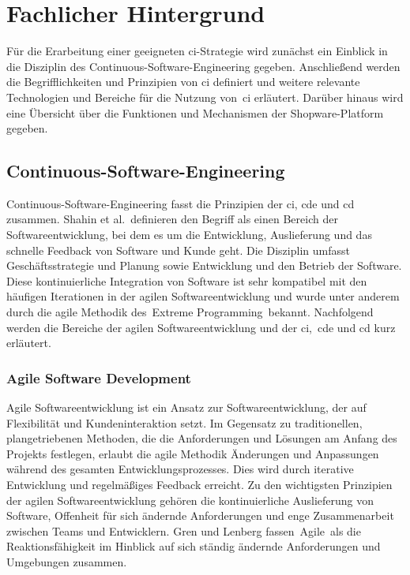 
\section{Fachlicher Hintergrund} \label{sec:02-background}

Für die Erarbeitung einer geeigneten \acrshort{ci}-Strategie wird zunächst ein Einblick in die Disziplin des
Continuous-Software-Engineering gegeben.
Anschließend werden die Begrifflichkeiten und Prinzipien von \acrlong{ci} definiert und weitere
relevante Technologien und Bereiche für die Nutzung von\ \acrshort{ci} erläutert.
Darüber hinaus wird eine Übersicht über die Funktionen und Mechanismen der Shopware-Platform gegeben.

\subsection{Continuous-Software-Engineering} \label{subsec:02-background-1}

Continuous-Software-Engineering fasst die Prinzipien der \acrfull{ci}, \acrfull{cde} und \acrfull{cd} zusammen.
Shahin et al.\ definieren den Begriff als einen Bereich der Softwareentwicklung, bei dem es um die Entwicklung,
Auslieferung und das schnelle Feedback von Software und Kunde geht.
Die Disziplin umfasst Geschäftsstrategie und Planung sowie Entwicklung und den Betrieb der Software.
Diese kontinuierliche Integration von Software ist sehr kompatibel mit den häufigen Iterationen in der agilen
Softwareentwicklung und wurde unter anderem durch die agile Methodik des\ \glqq Extreme Programming\grqq\ bekannt.
Nachfolgend werden die Bereiche der agilen Softwareentwicklung und der \acrshort{ci},\ \acrshort{cde} und \acrshort{cd}
kurz erläutert.

\subsubsection{Agile Software Development}

Agile Softwareentwicklung ist ein Ansatz zur Softwareentwicklung, der auf Flexibilität und Kundeninteraktion setzt.
Im Gegensatz zu traditionellen, plangetriebenen Methoden, die die Anforderungen und Lösungen am Anfang des Projekts
festlegen, erlaubt die agile Methodik Änderungen und Anpassungen während des gesamten Entwicklungsprozesses.
Dies wird durch iterative Entwicklung und regelmäßiges Feedback erreicht.
Zu den wichtigsten Prinzipien der agilen Softwareentwicklung gehören die kontinuierliche Auslieferung von Software,
Offenheit für sich ändernde Anforderungen und enge Zusammenarbeit zwischen Teams und Entwicklern.
Gren und Lenberg fassen\ \glqq Agile\grqq\ als die Reaktionsfähigkeit im Hinblick auf sich ständig ändernde
Anforderungen und Umgebungen zusammen.

